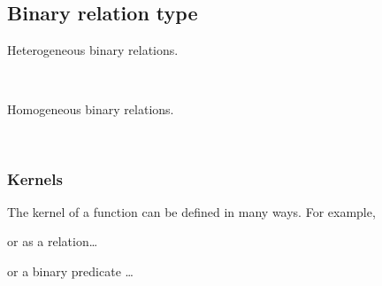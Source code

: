 \documentclass[sigplan,screen]{acmart}
\begin{document}
\subsection{Binary relation type}\label{binary-relation-type}
Heterogeneous binary relations.
\begin{code}%
\>[0]\AgdaSpace{}%
\AgdaSymbol{:}\AgdaSpace{}%
\AgdaSpace{}%
\AgdaSpace{}%
\AgdaSpace{}%
\AgdaSpace{}%
\AgdaSpace{}%
\AgdaSpace{}%
\AgdaSymbol{(}\AgdaSpace{}%
\AgdaSymbol{:}\AgdaSpace{}%
\AgdaSymbol{)}\AgdaSpace{}%
\AgdaSpace{}%
\AgdaSymbol{(}\AgdaSpace{}%
\AgdaSpace{}%
\AgdaSpace{}%
\AgdaSpace{}%
\AgdaSpace{}%
\AgdaSymbol{)}\AgdaSpace{}%
\<%
\\
\>[0]\AgdaSpace{}%
\AgdaSpace{}%
\AgdaSpace{}%
\AgdaSpace{}%
\AgdaSymbol{=}\AgdaSpace{}%
\AgdaSpace{}%
\AgdaSpace{}%
\AgdaSpace{}%
\AgdaSpace{}%
\AgdaSpace{}%
\<%
\end{code}

Homogeneous binary relations.
\begin{code}%
\>[0]\AgdaSpace{}%
\AgdaSymbol{:}\AgdaSpace{}%
\AgdaSpace{}%
\AgdaSpace{}%
\AgdaSpace{}%
\AgdaSymbol{(}\AgdaSpace{}%
\AgdaSymbol{:}\AgdaSpace{}%
\AgdaSymbol{)}\AgdaSpace{}%
\AgdaSpace{}%
\AgdaSpace{}%
\AgdaSpace{}%
\AgdaSpace{}%
\AgdaSpace{}%
\<%
\\
\>[0]\AgdaSpace{}%
\AgdaSpace{}%
\AgdaSpace{}%
\AgdaSymbol{=}\AgdaSpace{}%
\AgdaSpace{}%
\AgdaSpace{}%
\AgdaSpace{}%
\<%
\end{code}

\subsubsection{Kernels}\label{kernels}
The kernel of a function can be defined in many ways. For example,
\begin{code}  \end{code}
or as a relation\ldots{}
\begin{code}  \end{code}
or a binary predicate …
\begin{code}\end{code}
\end{document}
